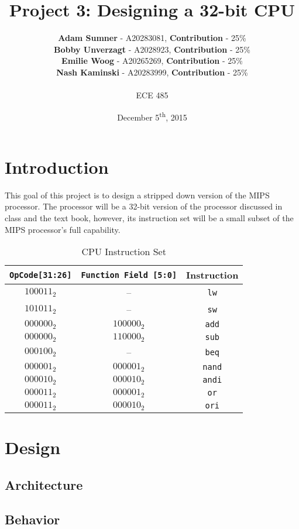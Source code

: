 \documentclass[12pt]{article}
\title{\textbf{Project 3: Designing a 32-bit CPU}}
\author{\textbf{Adam Sumner} - A20283081, \textbf{Contribution} - 25\% \\
		\textbf{Bobby Unverzagt} - A2028923, \textbf{Contribution} - 25\% \\
		\textbf{Emilie Woog} - A20265269, \textbf{Contribution} - 25\% \\
		\textbf{Nash Kaminski} - A20283999, \textbf{Contribution} - 25\% \\ ~\\ ECE 485}
\date{December 5\textsuperscript{th}, 2015}
\begin{document}
\maketitle

\section{Introduction}
This goal of this project is to design a stripped down version of the MIPS processor. The processor will be a 32-bit version of the processor discussed in class and the text book, however, its instruction set will be a small subset of the MIPS processor's full capability. 


\begin{table}[H]
	\centering
	\begin{tabular}{|c|c|c|}
		\hline
		\texttt{OpCode[31:26]} & \texttt{Function Field [5:0]} & Instruction \\ 
		\hline
		$100011_2$ & -- & \texttt{lw} \\
		\hline
		$101011_2$ & -- & \texttt{sw}\\
		\hline
		$000000_2$ & $100000_2$ & \texttt{add} \\
		\hline
		$000000_2$ & $110000_2$ & \texttt{sub}\\
		\hline
		$000100_2$ & -- & \texttt{beq}\\
		\hline
		$000001_2$ & $000001_2$ & \texttt{nand} \\
		\hline
		$000010_2$ & $000010_2$ & \texttt{andi} \\
		\hline
		$000011_2$ & $000001_2$ & \texttt{or} \\
		\hline
		$000011_2$ & $000010_2$ & \texttt{ori} \\
		\hline		
	\end{tabular}
	\caption{CPU Instruction Set}
	\label{tab:operations}
\end{table}
\section{Design}
\subsection{Architecture}




\subsection{Behavior}
\end{document}
